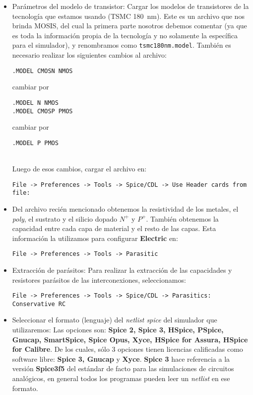 \begin{itemize}
\item Parámetros del modelo de transistor: Cargar los modelos de transistores de la tecnología que estamos usando (TSMC 180~nm). Este es un archivo que nos brinda MOSIS, del cual la primera parte nosotros debemos comentar (ya que es toda la información propia de la tecnología y no solamente la específica para el simulador), y renombramos como {\footnotesize\verb#tsmc180nm.model#}. También es necesario realizar los siguientes cambios al archivo:\\
\begin{footnotesize}\verb#.MODEL CMOSN NMOS#\end{footnotesize} cambiar por \begin{footnotesize}\verb#.MODEL N NMOS# \\
\verb#.MODEL CMOSP PMOS#\end{footnotesize} cambiar por \begin{footnotesize}\verb#.MODEL P PMOS# \end{footnotesize} \\
Luego de esos cambios, cargar el archivo en:\\
\begin{footnotesize}\verb.File -> Preferences -> Tools -> Spice/CDL -> Use Header cards from file:.\end{footnotesize}
	\item Del archivo recién mencionado obtenemos la resistividad de los metales, el \emph{poly}, el sustrato y el silicio dopado $N^+$ y $P^+$. También obtenemos la capacidad entre cada capa de material y el resto de las capas. Esta información la utilizamos para configurar \textbf{Electric} en: \\
\begin{footnotesize}\verb.File -> Preferences -> Tools -> Parasitic. \end{footnotesize}
\item Extracción de parásitos: Para realizar la extracción de las capacidades y resistores parásitos de las interconexiones, seleccionamos: \\
\begin{footnotesize}\verb.File -> Preferences -> Tools -> Spice/CDL -> Parasitics: Conservative RC. \end{footnotesize}
\item Seleccionar el formato (lenguaje) del \emph{netlist spice} del simulador que utilizaremos: Las opciones son: \textbf{Spice 2, Spice 3, HSpice, PSpice, Gnucap, SmartSpice,  Spice Opus, Xyce, HSpice for Assura, HSpice for Calibre}. De los cuales, sólo 3 opciones tienen licencias calificadas como software libre: \textbf{Spice 3, Gnucap} y \textbf{Xyce}. \textbf{Spice 3} hace referencia a la versión \textbf{Spice3f5} del estándar de facto para las simulaciones de circuitos analógicos, en general todos los programas pueden leer un \emph{netlist} en ese formato.
\end{itemize}


